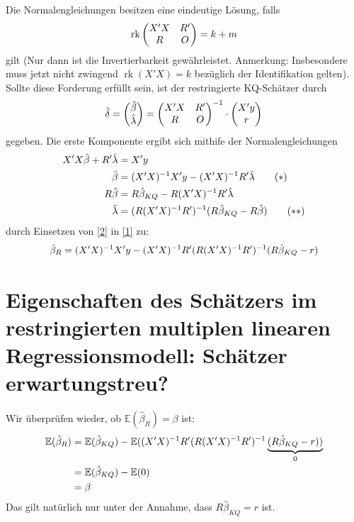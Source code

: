 \documentclass{article}
\newcommand{\E}{\mathbb{E}}
\DeclareMathOperator{\rk}{rk}
\begin{document}
	Die Normalengleichungen besitzen eine eindeutige Lösung, falls
	\begin{align}
		\rk\begin{pmatrix}
			X'X & R' \\ R & O
		\end{pmatrix} = k+m \notag
	\end{align}
	gilt (Nur dann ist die Invertierbarkeit gewährleistet. Anmerkung: Insbesondere muss jetzt nicht zwingend $\rk(X'X)=k$ bezüglich der Identifikation gelten). Sollte diese Forderung erfüllt sein, ist der restringierte KQ-Schätzer durch
	\begin{align}
		\hat{\delta} = \begin{pmatrix}
			\hat{\beta} \\ \hat{\lambda}
		\end{pmatrix} = \begin{pmatrix}
			X'X & R' \\ R & O
		\end{pmatrix}^{-1}\cdot \begin{pmatrix}
			X'y \\ r
		\end{pmatrix} \notag
	\end{align}
	gegeben. Die erste Komponente ergibt sich mithife der Normalengleichungen
	\begin{align}
		X'X\hat{\beta} + R'\hat{\lambda} &= X'y \notag \\
		\label{1}
		\hat{\beta} &= (X'X)^{-1}X'y - (X'X)^{-1}R'\hat{\lambda} \tag{\textasteriskcentered} \\
		R\hat{\beta} &= R\hat{\beta}_{KQ} - R(X'X)^{-1}R'\hat{\lambda} \notag \\
		\label{2}
		\hat{\lambda} &= (R(X'X)^{-1}R')^{-1}(R\hat{\beta}_{KQ}-R\hat{\beta}) \tag{\textasteriskcentered\textasteriskcentered}
	\end{align}
	durch Einsetzen von \eqref{2} in \eqref{1} zu:
	\begin{align}
		\hat{\beta}_R = (X'X)^{-1}X'y - (X'X)^{-1}R'(R(X'X)^{-1}R')^{-1}(R\hat{\beta}_{KQ}-r) \notag
	\end{align}
	
	\section{Eigenschaften des Schätzers im restringierten multiplen linearen Regressionsmodell: Schätzer erwartungstreu?}
	Wir überprüfen wieder, ob $\E(\hat{\beta}_R)=\beta$ ist:
	\begin{align}
		\E(\hat{\beta}_R) &= \E(\hat{\beta}_{KQ}) - \E((X'X)^{-1}R'(R(X'X)^{-1}R')^{-1}\underbrace{(R\hat{\beta}_{KQ} - r))}_{0} \notag \\
		&= \E(\hat{\beta}_{KQ}) - \E(0) \notag \\
		&= \beta \notag
	\end{align}
	Das gilt natürlich nur unter der Annahme, dass $R\hat{\beta}_{KQ} = r$ ist.
	
\end{document}
